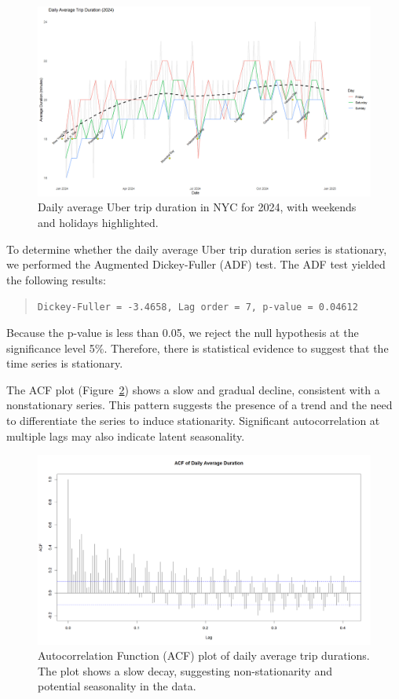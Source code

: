 \documentclass{article}
\begin{document}
\begin{figure}
  \includegraphics[width=\textwidth]{avg_trip_duration_by_day.png}
  \caption{Daily average Uber trip duration in NYC for 2024, with weekends and holidays highlighted.}
  \label{fig:timeseries_plot}
\end{figure}


To determine whether the daily average Uber trip duration series is stationary, we performed the Augmented Dickey-Fuller (ADF) test. The ADF test yielded the following results:

\begin{quote}
\texttt{Dickey-Fuller = -3.4658, Lag order = 7, p-value = 0.04612}
\end{quote}

Because the p-value is less than 0.05, we reject the null hypothesis at the significance level 5\%. Therefore, there is statistical evidence to suggest that the time series is stationary.

The ACF plot (Figure~\ref{fig:acf_plot}) shows a slow and gradual decline, consistent with a nonstationary series. This pattern suggests the presence of a trend and the need to differentiate the series to induce stationarity. Significant autocorrelation at multiple lags may also indicate latent seasonality.

\begin{figure}
  \includegraphics[width=\textwidth]{finalproject/images/acf-plot.png}
  \caption{Autocorrelation Function (ACF) plot of daily average trip durations. The plot shows a slow decay, suggesting non-stationarity and potential seasonality in the data.}
  \label{fig:acf_plot}
\end{figure}
\end{document}
